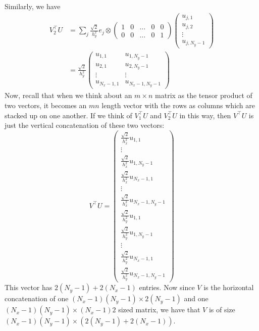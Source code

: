 \documentclass[reqno]{article}
\begin{document}
	Similarly, we have
	\begin{equation}
	\begin{split}
		V_2^\top U &= 
		\sum_j \frac{\sqrt{2}}{h_y^2}
		e_j \otimes
		\begin{pmatrix}
			1 &0 &\ldots &0 &0 \\
			0 &0 &\ldots &0 &1
		\end{pmatrix}
		\begin{pmatrix}
			u_{j, 1} \\
			u_{j, 2} \\
			\vdots \\
			u_{j, N_y - 1}
		\end{pmatrix} \\
		&= \frac{\sqrt{2}}{h_y^2}
		\begin{pmatrix}
			u_{1, 1} & u_{1, N_y - 1} \\
			u_{2, 1} &u_{2, N_y - 1} \\
			\vdots &\vdots \\
			u_{N_x - 1, 1} & u_{N_x - 1, N_y - 1}
		\end{pmatrix}
	\end{split}
	\end{equation}
	Now, recall that when we think about an $m\times n$ matrix as the tensor product of two vectors, it becomes an $mn$ length vector with the rows as columns which are stacked up on one another. If we think of $V_1^\top U$ and $V_2^\top U$ in this way, then $V^\top U$ is just the vertical concatenation of these two vectors:
	\begin{equation}
		V^\top U =
		\begin{pmatrix}
			\frac{\sqrt{2}}{h_x^2} u_{1, 1} \\
			\vdots \\
			\frac{\sqrt{2}}{h_x^2} u_{1, N_y - 1} \\
			\frac{\sqrt{2}}{h_x^2} u_{N_x - 1, 1} \\
			\vdots \\
			\frac{\sqrt{2}}{h_x^2} u_{N_x - 1, N_y - 1} \\
			\frac{\sqrt{2}}{h_y^2} u_{1, 1} \\
			\frac{\sqrt{2}}{h_y^2} u_{1, N_y - 1} \\
			\vdots \\
			\frac{\sqrt{2}}{h_y^2} u_{N_x - 1, 1} \\
			\frac{\sqrt{2}}{h_y^2} u_{N_x - 1, N_y - 1}
		\end{pmatrix}
	\end{equation}
	This vector has $2(N_y - 1) + 2(N_x - 1)$ entries. Now since $V$ is the horizontal concatenation of one $(N_x - 1)(N_y - 1)\times 2(N_y - 1)$ and one $(N_x - 1)(N_y - 1)\times (N_x - 1)2$ sized matrix, we have that $V$ is of size $(N_x - 1)(N_y - 1)\times \left(2(N_y - 1) + 2(N_x - 1)\right)$. 
	
\end{document}
